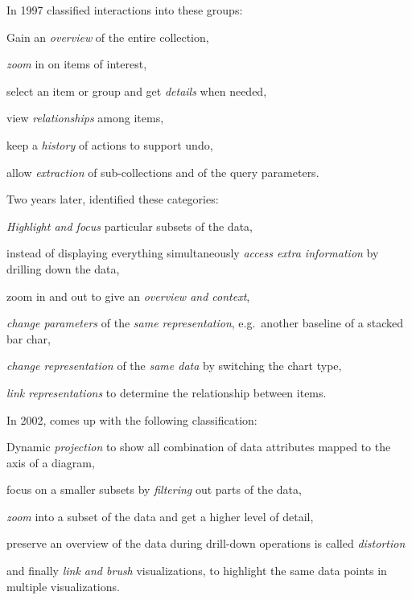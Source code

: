 \documentclass{article}
\begin{document}
In 1997 \textcite{Shneiderman1996} classified interactions into these groups:
\begin{enumerate*}[label=(\arabic*)]
  \item
    Gain an \emph{overview} of the entire collection,
  \item
    \emph{zoom} in on items of interest,
  \item
    select an item or group and get \emph{details} when needed,
  \item
    view \emph{relationships} among items,
  \item
    keep a \emph{history} of actions to support undo,
  \item
    allow \emph{extraction} of sub-collections and of the query parameters.
\end{enumerate*}

Two years later, \textcite{Dix1998} identified these categories:
\begin{enumerate*}[label=(\arabic*)]
  \item
    \emph{Highlight and focus} particular subsets of the data,
  \item
    instead of displaying everything simultaneously \emph{access extra information} by drilling down the data,
  \item
    zoom in and out to give an \emph{overview and context},
  \item
    \emph{change parameters} of the \emph{same representation}, e.g.\ another baseline of a stacked bar char,
  \item
    \emph{change representation} of the \emph{same data} by switching the chart type,
  \item 
    \emph{link representations} to determine the relationship between items.
\end{enumerate*}

In 2002, \textcite{Keim2002} comes up with the following classification:
\begin{enumerate*}[label=(\arabic*)]
  \item
    Dynamic \emph{projection} to show all combination of data attributes mapped to the axis of a diagram,
  \item 
    focus on a smaller subsets by \emph{filtering} out parts of the data,
  \item 
    \emph{zoom} into a subset of the data and get a higher level of detail,
  \item 
    preserve an overview of the data during drill-down operations is called \emph{distortion}
  \item 
    and finally \emph{link and brush} visualizations, to highlight the same data points in multiple visualizations.
\end{enumerate*}
\end{document}
